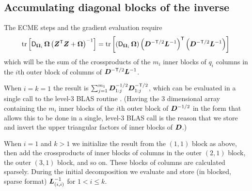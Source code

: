 \documentclass[12pt]{article}
\begin{document}
\subsection{Accumulating diagonal blocks of the inverse}
\label{ssec:InverseBlocks}

The ECME steps and the gradient evaluation require
\begin{equation}
  \label{eq:InverseBlocks}
    \operatorname{tr}\left[\operatorname{\mathsf{D}}_{\bm{\Omega}_i}\bm{\Omega}\left(\bm{Z}^\mathsf{T}\bm{Z}+\bm{\Omega}\right)^{-1}\right]
    = \operatorname{tr}\left[\left(\operatorname{\mathsf{D}}_{\bm{\Omega}_i}\bm{\Omega}\right)
      \left(\bm{D}^{-\mathsf{T}/2}\bm{L}^{-1}\right)^\mathsf{T}
      \left(\bm{D}^{-\mathsf{T}/2}\bm{L}^{-1}\right)\right]
\end{equation}
which will be the sum of the crossproducts of the $m_i$ inner blocks
of $q_i$ columns in the $i$th outer block of columns of
$\bm{D}^{-\mathsf{T}/2}\bm{L}^{-1}$.

When $i=k=1$ the result is
$\sum_{j=1}^{m_1}\bm{D}^{-1/2}_{1:j}\bm{D}^{-\mathsf{T}/2}_{1:j}$, which can
be evaluated in a single call to the level-3 BLAS routine
.  (Having the 3 dimensional array containing the $m_i$
inner blocks of the $i$th outer block of $\bm{D}^{-1/2}$ in the form that
allows this to be done in a single, level-3 BLAS call is the reason
that we store and invert the upper triangular factors of inner blocks
of $\bm{D}$.)

When $i=1$ and $k>1$ we initialize the result from the $(1,1)$ block
as above, then add the crossproducts of inner blocks of columns in the
outer $(2,1)$ block, the outer $(3,1)$ block, and so on.  These blocks
of columns are calculated sparsely.  During the initial decomposition
we evaluate and store (in blocked, sparse format) $\bm{L}^{-1}_{(i,i)}$
for $1<i\le k$.
  

\end{document}
